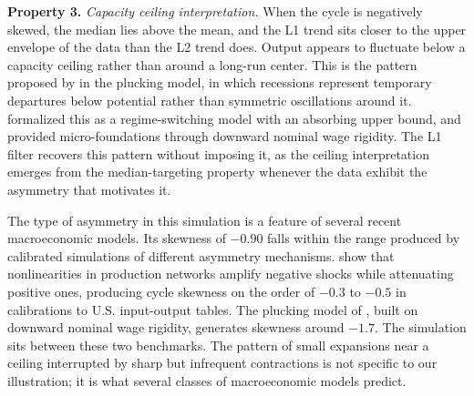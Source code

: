 \documentclass[10pt]{article}
\begin{document}
\textbf{Property 3.} \textit{Capacity ceiling interpretation.} When the cycle is negatively skewed, the median lies above the mean, and the L1 trend sits closer to the upper envelope of the data than the L2 trend does. Output appears to fluctuate below a capacity ceiling rather than around a long-run center. This is the pattern proposed by \citet{friedman1964, friedman1993} in the plucking model, in which recessions represent temporary departures below potential rather than symmetric oscillations around it. \citet{kim_nelson1999} formalized this as a regime-switching model with an absorbing upper bound, and \citet{dupraz_etal2020} provided micro-foundations through downward nominal wage rigidity. The L1 filter recovers this pattern without imposing it, as the ceiling interpretation emerges from the median-targeting property whenever the data exhibit the asymmetry that motivates it.

The type of asymmetry in this simulation is a feature of several recent macroeconomic models. Its skewness of $-0.90$ falls within the range produced by calibrated simulations of different asymmetry mechanisms. \citet{baqaee_farhi2019} show that nonlinearities in production networks amplify negative shocks while attenuating positive ones, producing cycle skewness on the order of $-0.3$ to $-0.5$ in calibrations to U.S. input-output tables. The plucking model of \citet{dupraz_etal2020}, built on downward nominal wage rigidity, generates skewness around $-1.7$. The simulation sits between these two benchmarks. The pattern of small expansions near a ceiling interrupted by sharp but infrequent contractions is not specific to our illustration; it is what several classes of macroeconomic models predict.
\end{document}
